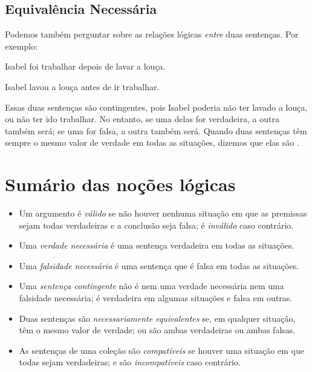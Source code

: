 \subsection{Equivalência Necessária}

Podemos também perguntar sobre as relações lógicas \emph{entre} duas sentenças.
Por exemplo:
\begin{earg}
\item[] Isabel foi trabalhar depois de lavar a louça.
\item[] Isabel lavou a louça antes de ir trabalhar.
\end{earg}
Essas duas sentenças são contingentes, pois Isabel poderia não ter lavado a louça, ou não ter ido trabalhar.
No entanto, se uma delas for verdadeira, a outra também será; se uma for falsa, a outra também será.
Quando duas sentenças têm sempre o mesmo valor de verdade em todas as situações, dizemos que elas são .

\section*{Sumário das noções lógicas}

\begin{itemize}
\item Um argumento é \textit{válido} se não houver nenhuma situação em que as premissas sejam todas verdadeiras e a conclusão seja falsa; é \textit{inválido} caso contrário.

\item Uma \textit{verdade necessária} é uma sentença verdadeira em todas as situações.

\item Uma \textit{falsidade necessária} é uma sentença que é falsa em todas as situações.

\item Uma \textit{sentença contingente} não é nem uma verdade necessária nem uma falsidade necessária; é verdadeira em algumas situações e falsa em outras.

\item Duas sentenças são \textit{necessariamente equivalentes} se, em qualquer situação, têm o mesmo valor de verdade; ou são ambas verdadeiras ou ambas falsas.

\item As sentenças de uma coleção são \textit{compatíveis} se houver uma situação em que todas sejam verdadeiras; e são \textit{incompatíveis} caso contrário.
\end{itemize}



